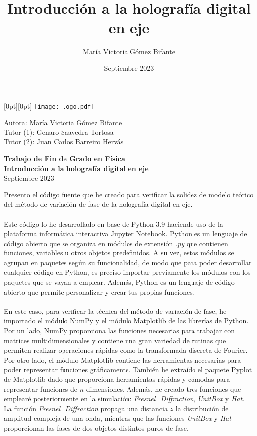 \documentclass[12pt]{article}
\title{Introducción a la holografía digital en eje}
\author{María Victoria Gómez Bifante}
\date{Septiembre 2023}
\begin{document}
\noindent\raisebox{0pt}[0pt][0pt]{
\texttt{[image: logo.pdf]}}\par
\vspace{0.5cm}
Autora: María Victoria Gómez Bifante\\
Tutor (1): Genaro Saavedra Tortosa\\
Tutor (2): Juan Carlos Barreiro Hervás
\vspace{0.75cm}
\begin{center} 
  \Large{\textbf{\underline{Trabajo de Fin de Grado en Física}}}\\
  \vspace{0.15cm}
  \Large{\textbf{Introducción a la holografía digital en eje}} \\
  \vspace{0.25cm}
  \large{Septiembre 2023}
\end{center}
\vspace{0.75cm}
Presento el código fuente que he creado para verificar la solidez de modelo teórico del método de variación de fase de la holografía digital en eje.  \\ \\
Este código lo he desarrollado en base de Python 3.9 haciendo uso de la plataforma informática interactiva Jupyter Notebook. Python es un lenguaje de código abierto que se organiza en módulos de extensión \textit{.py} que contienen funciones, variables u otros objetos predefinidos. A su vez, estos módulos se agrupan en paquetes según su funcionalidad, de modo que para poder desarrollar cualquier código en Python, es preciso importar previamente los módulos con los paquetes que se vayan a emplear. Además, Python es un lenguaje de código abierto que permite personalizar y crear tus propias funciones.\\ \\
En este caso, para verificar la técnica del método de variación de fase, he importado  el módulo NumPy y el módulo Matplotlib de las librerías de Python. Por un lado, NumPy proporciona las funciones necesarias para trabajar con matrices multidimensionales y contiene una gran variedad de rutinas que permiten realizar operaciones rápidas como la transformada discreta de Fourier. Por otro lado, el módulo Matplotlib contiene las herramientas necesarias para poder representar funciones gráficamente. También he extraído el paquete Pyplot de Matplotlib dado que proporciona herramientas rápidas y cómodas para representar funciones de $n$ dimensiones. Además, he creado tres funciones  que emplearé posteriormente en la simulación:  \textit{Fresnel\_Diffraction},  \textit{UnitBox} y \textit{Hat}. La función \textit{Fresnel\_Diffraction}  propaga una distancia $z$ la distribución de amplitud compleja de una onda, mientras que las funciones \textit{UnitBox} y \textit{Hat} proporcionan las fases de dos objetos distintos puros de fase.
\end{document}
